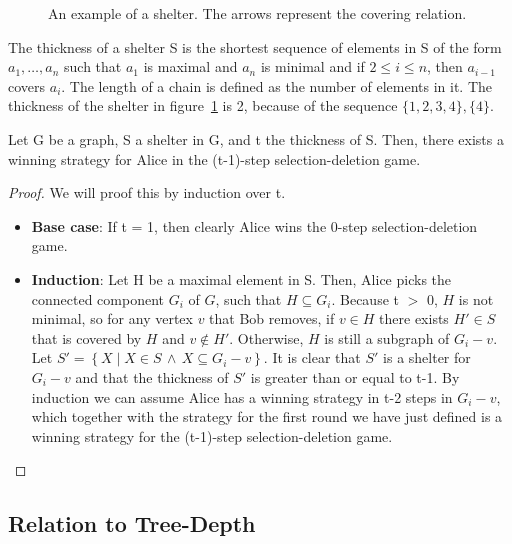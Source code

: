 \begin{figure}[H]

\caption{An example of a shelter. The arrows represent the covering relation. \label{fig:shelter-example}}
\end{figure}
The thickness of a shelter S is the shortest sequence of elements in S of the form $a_1, \ldots, a_n$ such that $a_1$ is maximal and $a_n$ is minimal and if $2 \leq i \leq n$, then $a_{i-1}$ covers $a_i$. The length of a chain is defined as the number of elements in it. The thickness of the shelter in figure~\ref{fig:shelter-example} is 2, because of the sequence $\{ 1, 2, 3, 4\}, \{4\}$.
\begin{lemma}
Let G be a graph, S a shelter in G, and t the thickness of S. Then, there exists a winning strategy for Alice in the (t-1)-step selection-deletion game.
\label{lemma:Alice-win}
\end{lemma}
\begin{proof}
We will proof this by induction over t.
\begin{itemize}
  \item \textbf{Base case}: If t = 1, then clearly Alice wins the 0-step selection-deletion game.
  \item \textbf{Induction}: Let H be a maximal element in S. Then, Alice picks the connected component $G_i$ of $G$, such that $H \subseteq G_i$. Because t $>$ 0, $H$ is not minimal, so for any vertex $v$ that Bob removes, if $v \in H$ there exists $H' \in S$ that is covered by $H$ and $v \notin H'$. Otherwise, $H$ is still a subgraph of $G_i - v$. Let $S' =\left\{X \mid X \in S \, \wedge \, X \subseteq G_i - v\right\}$. It is clear that $S'$ is a shelter for $G_i - v$ and that the thickness of $S'$ is greater than or equal to t-1. By induction we can assume Alice has a winning strategy in t-2 steps in $G_i - v$, which together with the strategy for the first round we have just defined is a winning strategy for the (t-1)-step selection-deletion game.
\end{itemize}
\end{proof}


\subsection{Relation to Tree-Depth}

